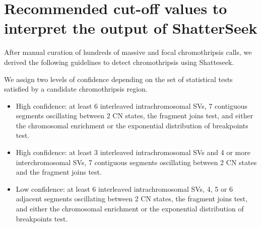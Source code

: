 \documentclass[twoside,a4wide,11pt]{article}\usepackage[]{graphicx}\usepackage[]{color}
\begin{document}


\section{Recommended cut-off values to interpret the output of ShatterSeek}

After manual curation of hundreds of massive and focal chromothripsis calls, 
we derived the following guidelines to detect chromothripsis using Shatteseek.

We assign two levels of confidence depending on the set of statistical tests
satisfied by a candidate chromothripsis region.

\begin{itemize}

\item High confidence: at least 6 interleaved intrachromosomal SVs, 7 contiguous segments oscillating between 2 CN states, 
the fragment joins test, and either the chromosomal enrichment or the exponential distribution of breakpoints test.

\item High confidence: at least 3 interleaved intrachromosomal SVs and 4 or more interchromosomal SVs, 7 contiguous segments oscillating between 2 CN states and the fragment joins test.

\item Low confidence: at least 6 interleaved intrachromosomal SVs, 4, 5 or 6 adjacent segments oscillating between 2 CN states, the fragment joins test, and either the chromosomal enrichment or the exponential distribution of breakpoints test.

\end{itemize}
\end{document}

